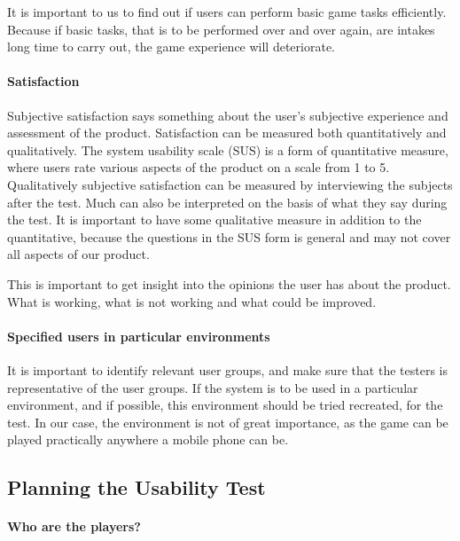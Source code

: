 		It is important to us to find out if users can perform basic game tasks efficiently. Because if basic tasks, that is to be performed over and over again, are intakes long time to carry out, the game experience will deteriorate.

	\paragraph{Satisfaction}

		Subjective satisfaction says something about the user's subjective experience and assessment of the product. Satisfaction can be measured both quantitatively and qualitatively. The system usability scale (SUS) is a form of quantitative measure, where users rate various aspects of the product on a scale from 1 to 5. Qualitatively subjective satisfaction can be measured by interviewing the subjects after the test. Much can also be interpreted on the basis of what they say during the test. It is important to have some qualitative measure in addition to the quantitative, because the questions in the SUS form is general and may not cover all aspects of our product.

		This is important to get insight into the opinions the user has about the product. What is working, what is not working and what could be improved.

	\paragraph{Specified users in particular environments}

		It is important to identify relevant user groups, and make sure that the testers is representative of the user groups. If the system is to be used in a particular environment, and if possible, this environment should be tried recreated, for the test. In our case, the environment is not of great importance, as the game can be played practically anywhere a mobile phone can be.

\subsection{Planning the Usability Test}
\label{subsec:planustest}

	\paragraph{Who are the players?}\mbox{}\\

